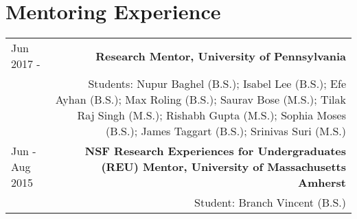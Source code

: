 \section*{Mentoring Experience}
\begin{tabular}{L!{\VRule}R}
Jun 2017 - & {\bf Research Mentor, University of Pennsylvania}\\
           & Students: 
                Nupur Baghel (B.S.);
                Isabel Lee (B.S.);
                Efe Ayhan (B.S.);
                Max Roling (B.S.); 
                Saurav Bose (M.S.);
                Tilak Raj Singh (M.S.);
                Rishabh Gupta (M.S.);
                Sophia Moses (B.S.);
                James Taggart (B.S.);
                Srinivas Suri (M.S.)
                \\
                Jun - Aug 2015& {\bf NSF Research Experiences for Undergraduates (REU) Mentor, University of Massachusetts Amherst} \\
& Student: Branch Vincent (B.S.) \\
\end{tabular}
